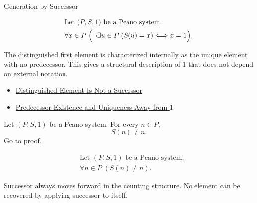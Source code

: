 \begin{topicbox}{Generation by Successor}
\begin{remark*}
\[
\begin{aligned}
&\text{Let } (P,S,1) \text{ be a Peano system.}\\
&\forall x \in P\;\Bigl(\neg\exists u \in P\;(S(u)=x) \Longleftrightarrow x=1\Bigr).
\end{aligned}
\]
\end{remark*}

\begin{remark*}[Interpretation]
The distinguished first element is characterized internally as the unique
element with no predecessor. This gives a structural description of $1$ that
does not depend on external notation.
\end{remark*}

\begin{remark*}[Dependencies]
\begin{itemize}
  \item \hyperref[ax:peano-one-not-successor]{Distinguished Element Is Not a Successor}
  \item \hyperref[thm:predecessor-exists-unique-away-from-one]{Predecessor Existence and Uniqueness Away from $1$}
\end{itemize}
\end{remark*}

\begin{tcolorbox}[colback=thmbox, colframe=thmborder, arc=2pt,
  left=6pt, right=6pt, top=4pt, bottom=4pt,
  title={\small\textbf{Theorem (No Object Is Its Own Successor)}} ,
  fonttitle=\small\bfseries]
\begin{theorem}
\label{thm:no-object-is-its-own-successor}
Let $(P,S,1)$ be a Peano system. For every $n \in P$,
\[
S(n) \neq n.
\]
\hyperref[prf-no-object-is-its-own-successor]{Go to proof.}
\end{theorem}
\end{tcolorbox}

\begin{remark*}
\[
\begin{aligned}
&\text{Let } (P,S,1) \text{ be a Peano system.}\\
&\forall n \in P\;(S(n) \neq n).
\end{aligned}
\]
\end{remark*}

\begin{remark*}[Interpretation]
Successor always moves forward in the counting structure. No element can be
recovered by applying successor to itself.
\end{remark*}


\end{topicbox}
